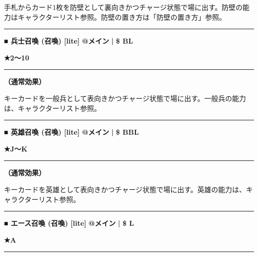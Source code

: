 \documentclass[twocolumn,a5paper,papersize,10pt]{jarticle}
\begin{document}
手札からカード1枚を防壁として裏向きかつチャージ状態で場に出す。防壁の能力はキャラクターリスト参照。防壁の置き方は「防壁の置き方」参照。
\vspace{2mm} %
\hrule height 0.5mm depth 0mm width 66.5mm %
\vspace{1mm} %
{\small\bf ■ 兵士召喚 {\scriptsize (召喚) [lite]}} %
\hfill 
{\footnotesize\bf @メイン }
  {\footnotesize\bf | } {\footnotesize\bf \$ BL}

{\footnotesize\bf ★2〜10}

\vspace{1mm}%
\hrule height 0.1mm depth 0mm width 66.5mm %
\vspace{1mm}%

{\bf（通常効果）}

キーカードを一般兵として表向きかつチャージ状態で場に出す。一般兵の能力は、キャラクターリスト参照。
\vspace{2mm} %
\hrule height 0.5mm depth 0mm width 66.5mm %
\vspace{1mm} %
{\small\bf ■ 英雄召喚 {\scriptsize (召喚) [lite]}} %
\hfill 
{\footnotesize\bf @メイン }
  {\footnotesize\bf | } {\footnotesize\bf \$ BBL}

{\footnotesize\bf ★J〜K}

\vspace{1mm}%
\hrule height 0.1mm depth 0mm width 66.5mm %
\vspace{1mm}%

{\bf（通常効果）}

キーカードを英雄として表向きかつチャージ状態で場に出す。英雄の能力は、キャラクターリスト参照。
\vspace{2mm} %
\hrule height 0.5mm depth 0mm width 66.5mm %
\vspace{1mm} %
{\small\bf ■ エース召喚 {\scriptsize (召喚) [lite]}} %
\hfill 
{\footnotesize\bf @メイン }
  {\footnotesize\bf | } {\footnotesize\bf \$ L}

{\footnotesize\bf ★A}

\vspace{1mm}%
\hrule height 0.1mm depth 0mm width 66.5mm %
\vspace{1mm}%
\end{document}
